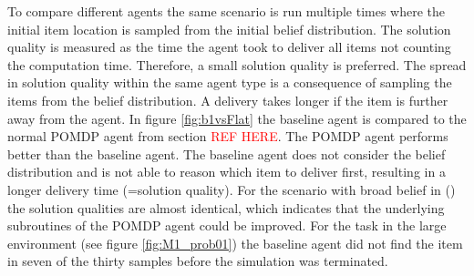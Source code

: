To compare different agents the same scenario is run multiple times where the initial item location is sampled from the initial belief distribution. The solution quality is measured as the time the agent took to deliver all items not counting the computation time. Therefore, a small solution quality is preferred. The spread in solution quality within the same agent type is a consequence of sampling the items from the belief distribution. A delivery takes longer if the item is further away from the agent. In figure \ref{fig:b1vsFlat} the baseline agent is compared to the normal POMDP agent from section \textcolor{red}{REF HERE}. The POMDP agent performs better than the baseline agent. The baseline agent does not consider the belief distribution and is not able to reason which item to deliver first, resulting in a longer delivery time (=solution quality). For the scenario with broad belief in () the solution qualities are almost identical, which indicates that the underlying subroutines of the POMDP agent could be improved. For the task in the large environment (see figure \ref{fig:M1_prob01}) the baseline agent did not find the item in seven of the thirty samples before the simulation was terminated.\\

